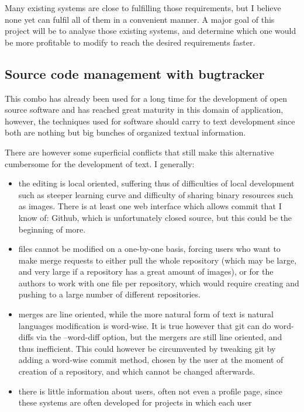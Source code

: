 \documentclass[12pt]{article}
\begin{document}
Many existing systems are close to fulfilling those requirements, but I believe none yet can fulfil all of them in a convenient manner. A major goal of this project will be to analyse those existing systems, and determine which one would be more profitable to modify to reach the desired requirements faster.

\subsection{Source code management with bugtracker}

This combo has already been used for a long time for the development of open source software and has reached great maturity in this domain of application, however, the techniques used for software should carry to text development since both are nothing but big bunches of organized textual information.

There are however some superficial conflicts that still make this alternative cumbersome for the development of text. I generally:

\begin{itemize}
  \item the editing is local oriented, suffering thus of difficulties of local development such as steeper learning curve and difficulty of sharing binary resources such as images. There is at least one web interface which allows commit that I know of: Github, which is unfortunately closed source, but this could be the beginning of more.
  
  \item files cannot be modified on a one-by-one basis, forcing users who want to make merge requests to either pull the whole repository (which may be large, and very large if a repository has a great amount of images), or for the authors to work with one file per repository, which would require creating and pushing to a large number of different repositories.
  
  \item merges are line oriented, while the more natural form of text is natural languages modification is word-wise. It is true however that git can do word-diffs via the --word-diff option, but the mergers are still line oriented, and thus inefficient. This could however be circumvented by tweaking git by adding a word-wise commit method, chosen by the user at the moment of creation of a repository, and which cannot be changed afterwards.
  
  \item there is little information about users, often not even a profile page, since these systems are often developed for projects in which each user 
\end{itemize}
\end{document}
